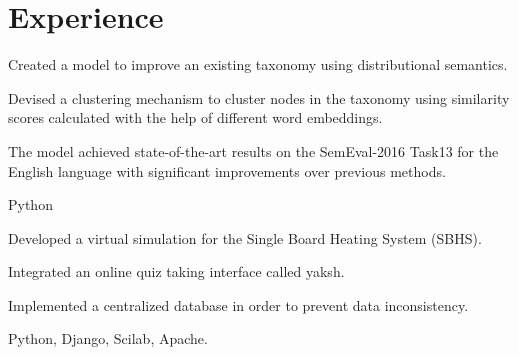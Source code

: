 
\section{Experience}

\sectionsep

\begin{tightemize}
\item Created a model to improve an existing taxonomy using distributional semantics.
\item Devised a clustering mechanism to cluster nodes in the taxonomy using similarity scores calculated with the help of different word embeddings.
\item The model achieved state-of-the-art results on the SemEval-2016 Task13 for the English language with significant improvements over previous methods.
\item {} Python
\end{tightemize}
\sectionsep

\begin{tightemize}
\item Developed a virtual simulation for the Single Board Heating System (SBHS).
\item Integrated an online quiz taking interface called yaksh.
\item Implemented a centralized database in order to prevent data inconsistency.
\item {} Python, Django, Scilab, Apache.
\end{tightemize}
\sectionsep